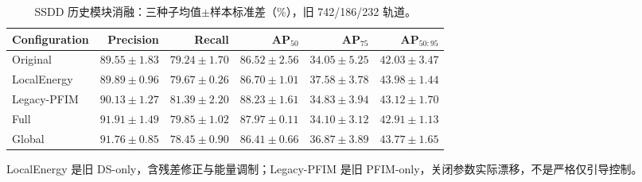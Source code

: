 \documentclass[journal]{IEEEtran}
\begin{document}
\begin{table}[!t]
\centering
\small
\setlength{\tabcolsep}{3pt}
\caption{SSDD 历史模块消融：三种子均值$\pm$样本标准差（\%），旧 742/186/232 轨道。}
\label{tab:component_ablation}
\begin{tabular*}{\textwidth}{@{\extracolsep{\fill}}lrrrrr}
\toprule
Configuration & Precision & Recall & AP$_{50}$ & AP$_{75}$ & AP$_{50:95}$ \\
\midrule
Original
& $89.55\pm1.83$ & $79.24\pm1.70$
& $86.52\pm2.56$ & $34.05\pm5.25$ & $42.03\pm3.47$ \\
LocalEnergy
& $89.89\pm0.96$ & $79.67\pm0.26$
& $86.70\pm1.01$ & $37.58\pm3.78$ & $43.98\pm1.44$ \\
Legacy-PFIM
& $90.13\pm1.27$ & $81.39\pm2.20$
& $88.23\pm1.61$ & $34.83\pm3.94$ & $43.12\pm1.70$ \\
Full
& $91.91\pm1.49$ & $79.85\pm1.02$
& $87.97\pm0.11$ & $34.10\pm3.12$ & $42.91\pm1.13$ \\
Global
& $91.76\pm0.85$ & $78.45\pm0.90$
& $86.41\pm0.66$ & $36.87\pm3.89$ & $43.77\pm1.65$ \\
\bottomrule
\end{tabular*}
\smallskip
\begin{minipage}{\linewidth}
\footnotesize
LocalEnergy 是旧 DS-only，含残差修正与能量调制；Legacy-PFIM 是旧 PFIM-only，关闭参数实际漂移，不是严格仅引导控制。
\end{minipage}
\end{table}
\end{document}
